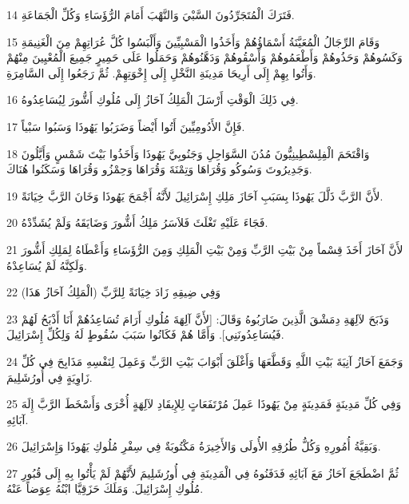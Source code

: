 \par 14 فَتَرَكَ الْمُتَجَرِّدُونَ السَّبْيَ وَالنَّهْبَ أَمَامَ الرُّؤَسَاءِ وَكُلِّ الْجَمَاعَةِ.
\par 15 وَقَامَ الرِّجَالُ الْمُعَيَّنَةُ أَسْمَاؤُهُمْ وَأَخَذُوا الْمَسْبِيِّينَ وَأَلْبَسُوا كُلَّ عُرَاتِهِمْ مِنَ الْغَنِيمَةِ وَكَسُوهُمْ وَحَذُوهُمْ وَأَطْعَمُوهُمْ وَأَسْقُوهُمْ وَدَهَّنُوهُمْ وَحَمَلُوا عَلَى حَمِيرٍ جَمِيعَ الْمُعْيِينَ مِنْهُمْ وَأَتُوا بِهِمْ إِلَى أَرِيحَا مَدِينَةِ النَّخْلِ إِلَى إِخْوَتِهِمْ. ثُمَّ رَجَعُوا إِلَى السَّامِرَةِ.
\par 16 فِي ذَلِكَ الْوَقْتِ أَرْسَلَ الْمَلِكُ آحَازُ إِلَى مُلُوكِ أَشُّورَ لِيُسَاعِدُوهُ.
\par 17 فَإِنَّ الأَدُومِيِّينَ أَتُوا أَيْضاً وَضَرَبُوا يَهُوذَا وَسَبُوا سَبْياً.
\par 18 وَاقْتَحَمَ الْفِلِسْطِينِيُّونَ مُدُنَ السَّوَاحِلِ وَجَنُوبِيَّ يَهُوذَا وَأَخَذُوا بَيْتَ شَمْسٍ وَأَيَّلُونَ وَجَدِيرُوتَ وَسُوكُو وَقُرَاهَا وَتِمْنَةَ وَقُرَاهَا وَحِمْزُو وَقُرَاهَا وَسَكَنُوا هُنَاكَ.
\par 19 لأَنَّ الرَّبَّ ذَلَّلَ يَهُوذَا بِسَبَبِ آحَازَ مَلِكِ إِسْرَائِيلَ لأَنَّهُ أَجْمَحَ يَهُوذَا وَخَانَ الرَّبَّ خِيَانَةً.
\par 20 فَجَاءَ عَلَيْهِ تَغْلَثَ فَلاَسَرُ مَلِكُ أَشُّورَ وَضَايَقَهُ وَلَمْ يُشَدِّدْهُ.
\par 21 لأَنَّ آحَازَ أَخَذَ قِسْماً مِنْ بَيْتِ الرَّبِّ وَمِنْ بَيْتِ الْمَلِكِ وَمِنَ الرُّؤَسَاءِ وَأَعْطَاهُ لِمَلِكِ أَشُّورَ وَلَكِنَّهُ لَمْ يُسَاعِدْهُ.
\par 22 وَفِي ضِيقِهِ زَادَ خِيَانَةً لِلرَّبِّ (الْمَلِكُ آحَازُ هَذَا)
\par 23 وَذَبَحَ لآلِهَةِ دِمَشْقَ الَّذِينَ ضَارَبُوهُ وَقَالَ: [لأَنَّ آلِهَةَ مُلُوكِ أَرَامَ تُسَاعِدُهُمْ أَنَا أَذْبَحُ لَهُمْ فَيُسَاعِدُونَنِي]. وَأَمَّا هُمْ فَكَانُوا سَبَبَ سُقُوطٍ لَهُ وَلِكُلِّ إِسْرَائِيلَ.
\par 24 وَجَمَعَ آحَازُ آنِيَةَ بَيْتِ اللَّهِ وَقَطَّعَهَا وَأَغْلَقَ أَبْوَابَ بَيْتِ الرَّبِّ وَعَمِلَ لِنَفْسِهِ مَذَابِحَ فِي كُلِّ زَاوِيَةٍ فِي أُورُشَلِيمَ.
\par 25 وَفِي كُلِّ مَدِينَةٍ فَمَدِينَةٍ مِنْ يَهُوذَا عَمِلَ مُرْتَفَعَاتٍ لِلإِيقَادِ لآلِهَةٍ أُخْرَى وَأَسْخَطَ الرَّبَّ إِلَهَ آبَائِهِ.
\par 26 وَبَقِيَّةُ أُمُورِهِ وَكُلُّ طُرُقِهِ الأُولَى وَالأَخِيرَةُ مَكْتُوبَةٌ فِي سِفْرِ مُلُوكِ يَهُوذَا وَإِسْرَائِيلَ.
\par 27 ثُمَّ اضْطَجَعَ آحَازُ مَعَ آبَائِهِ فَدَفَنُوهُ فِي الْمَدِينَةِ فِي أُورُشَلِيمَ لأَنَّهُمْ لَمْ يَأْتُوا بِهِ إِلَى قُبُورِ مُلُوكِ إِسْرَائِيلَ. وَمَلَكَ حَزَقِيَّا ابْنُهُ عِوَضاً عَنْهُ.

